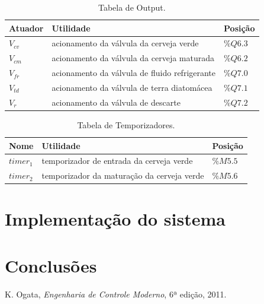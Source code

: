 \documentclass[12pt]{article}
\begin{document}
\begin{table}[H]
	\caption{Tabela de Output.}
	\centering
	\begin{tabular}{|  p{2cm} | p{10cm} | p{2cm} | }
		\hline
		Atuador & Utilidade & Posição\\
		\hline
  		$V_{cv}$ & acionamento da válvula da cerveja verde & $\%Q6.3$ \\
  		$V_{cm}$ & acionamento da válvula da cerveja maturada & $\%Q6.2$ \\
 		$V_{fr}$ & acionamento da válvula de fluido refrigerante & $\%Q7.0$ \\
		$V_{td}$ & acionamento da válvula de terra diatomácea & $\%Q7.1$ \\
		$V_r$ & acionamento da válvula de descarte & $\%Q7.2$ \\
 		\hline
	\end{tabular}
\end{table}


\begin{table}[H]
	\caption{Tabela de Temporizadores.}
	\centering
	\begin{tabular}{|  p{2cm} | p{10cm} | p{2cm} | }
		\hline
		Nome & Utilidade & Posição\\
		\hline
		$timer_1$ &  temporizador de entrada da cerveja verde & $\%M5.5$ \\
		$timer_2$ & temporizador da maturação da cerveja verde & $\%M5.6$ \\
		 \hline
	\end{tabular}
\end{table}

\section {Implementação do sistema}

\section {Conclusões}


\begin{thebibliography}{5}
	
	 K. Ogata, \emph{Engenharia de Controle Moderno}, 6ª edição, 2011.
	
\end{thebibliography}
\end{document}
